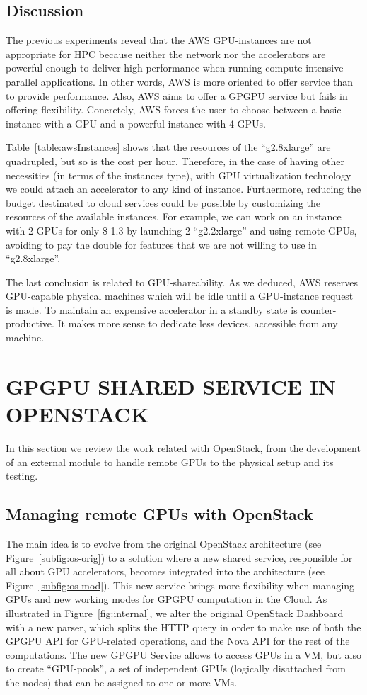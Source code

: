 \documentclass[a4paper,twoside]{article}
\begin{document}
\subsection{Discussion}
The previous experiments reveal that the AWS GPU-instances are not appropriate for HPC
because neither the network nor the accelerators are powerful enough to deliver high performance
when running compute-intensive parallel applications. 
In other words, AWS is more oriented to offer service than to provide performance.
Also, AWS aims to offer a GPGPU service but fails in offering flexibility.
Concretely, AWS forces the user to choose between a basic instance with a GPU and a powerful instance with 4 GPUs.

Table~\ref{table:awsInstances} shows that the resources of the ``g2.8xlarge'' are quadrupled, but so is the cost per hour.
Therefore, in the case of having other necessities (in terms of the instances type), with GPU virtualization technology we could attach an accelerator to any kind of instance.
Furthermore, reducing the budget destinated to cloud services could be possible by customizing the resources of the available instances.
For example, we can work on an instance with 2 GPUs for only \$ 1.3 by launching 2 ``g2.2xlarge'' and using remote GPUs, avoiding to pay the double for features that we are not willing to use in ``g2.8xlarge''.

The last conclusion is related to GPU-shareability. 
As we deduced, AWS reserves GPU-capable physical machines which will be idle until a GPU-instance request is made.
To maintain an expensive accelerator in a standby state is counter-productive. 
It makes more sense to dedicate less devices, accessible from any machine.

\section{\uppercase{GPGPU Shared Service in OpenStack}}
\label{sec:gpgpuOS}
In this section we review the work related with OpenStack, from the development of an external module to handle remote GPUs to the physical setup and its testing.

\subsection{Managing remote GPUs with OpenStack}
The main idea is to evolve from the original OpenStack architecture (see Figure~\ref{subfig:os-orig})
 to a solution where a new shared service, responsible for all about GPU accelerators, becomes integrated into the architecture (see Figure~\ref{subfig:os-mod}).
This new service brings more flexibility when managing GPUs and new working modes for GPGPU computation in the Cloud.
As illustrated in Figure~\ref{fig:internal}, we alter the original OpenStack Dashboard with a new parser, 
which splits the HTTP query in order to make use of both the GPGPU API for GPU-related operations, and the Nova API for the rest of the computations. 
The new GPGPU Service allows to access GPUs in a VM, but also to create ``GPU-pools'', a set of independent GPUs (logically disattached from the nodes) that can be assigned to one or more VMs.
\end{document}
